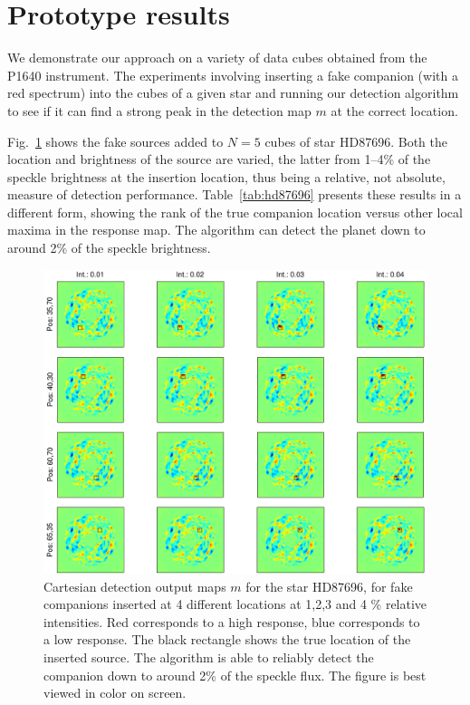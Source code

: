 \documentclass[12pt,pdftex,preprint]{aastex}
\newcommand{\fig}[1]{Fig.\ \ref{fig:#1}}
\newcommand{\tab}[1]{Table~\ref{tab:#1}}
\begin{document}
\section{Prototype results}
We demonstrate our approach on a variety of data cubes obtained from
the P1640 instrument. The experiments involving inserting a fake
companion (with a red spectrum) into the cubes of a given star and running our detection
algorithm to see if it can find a strong peak in the detection map $m$
at the correct location.

\fig{maps_hd87696} shows the fake sources added to $N=5$ cubes of star
HD87696. Both the location and brightness of the source are varied,
the latter from 1--4\% of the speckle brightness at the insertion
location, thus being a relative, not absolute, measure of detection
performance. \tab{hd87696} presents these results in a different form,
showing the rank of the true companion location versus other local
maxima in the response map. The algorithm can detect the planet down to
around 2\% of the speckle brightness.

\begin{figure}[h!]
\begin{center}
\includegraphics[width=6in]{figs/maps.pdf}
\end{center}
\vspace{-7mm}
\caption{Cartesian detection output maps $m$ for the star HD87696, for fake
 companions inserted at 4 different locations at 1,2,3 and 4 \%
 relative intensities. Red corresponds to a high response, blue
 corresponds to a low response. The black rectangle shows the true location of
the inserted source. The algorithm is able to reliably detect the
companion down to around 2\% of the speckle flux. The figure is best viewed in color on screen. }
\label{fig:maps_hd87696}
\end{figure}
\end{document}
